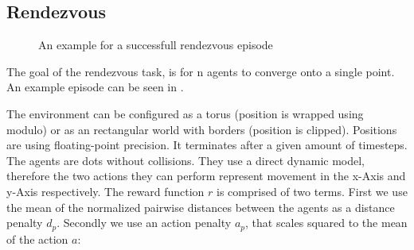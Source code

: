 \subsection{Rendezvous}
\begin{figure}[htp]
    \centering
    \hspace{1cm}                       
    \caption{An example for a successfull rendezvous episode}
    \label{fig:rendezvous_example}
\end{figure}

The goal of the rendezvous task, is for n agents to converge onto a single point. An example episode can be seen in .\par

The environment can be configured as a torus (position is wrapped using modulo) or as an rectangular world with borders (position is clipped). Positions are using floating-point precision. It terminates after a given amount of timesteps.
The agents are dots without collisions. They use a direct dynamic model, therefore the two actions they can perform represent movement in the x-Axis and y-Axis respectively.
The reward function $r$ is comprised of two terms. First we use the mean of the normalized pairwise distances between the agents as a distance penalty $d_p$. Secondly we use an action penalty $a_p$, that scales squared to the mean of the action $a$:

